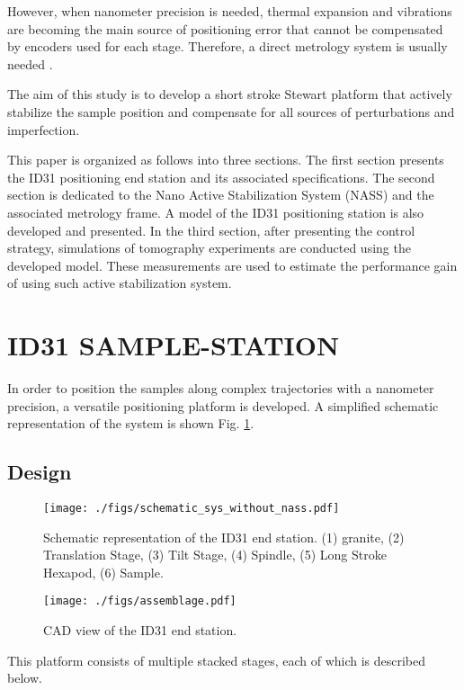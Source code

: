 \documentclass[a4paper, keeplastbox, biblatex]{jacow}
\begin{document}
However, when nanometer precision is needed, thermal expansion and vibrations are becoming the main source of positioning error that cannot be compensated by encoders used for each stage.
Therefore, a direct metrology system is usually needed \cite{DucotteMEDSI2016}.

The aim of this study is to develop a short stroke Stewart platform that actively stabilize the sample position and compensate for all sources of perturbations and imperfection.

This paper is organized as follows into three sections.
The first section presents the ID31 positioning end station and its associated specifications.
The second section is dedicated to the Nano Active Stabilization System (NASS) and the associated metrology frame. A model of the ID31 positioning station is also developed and presented.
In the third section, after presenting the control strategy, simulations of tomography experiments are conducted using the developed model. These measurements are used to estimate the performance gain of using such active stabilization system.

\section{ID31 SAMPLE-STATION}
\label{sec:orgaeecefa}
In order to position the samples along complex trajectories with a nanometer precision, a versatile positioning platform is developed. A simplified schematic representation of the system is shown Fig. \ref{fig:schematic_sys_without_nass}.

\subsection{Design}
\label{sec:org6bd25e8}
\begin{figure}[htbp]
\centering
\texttt{[image: ./figs/schematic\_sys\_without\_nass.pdf]}
\caption{\label{fig:schematic_sys_without_nass}
Schematic representation of the ID31 end station. (1) granite, (2) Translation Stage, (3) Tilt Stage, (4) Spindle, (5) Long Stroke Hexapod, (6) Sample.}
\end{figure}

\begin{figure*}
\centering
\texttt{[image: ./figs/assemblage.pdf]}
\caption{\label{fig:assemblage}
CAD view of the ID31 end station.}
\end{figure*}

This platform consists of multiple stacked stages, each of which is described below.
\end{document}
